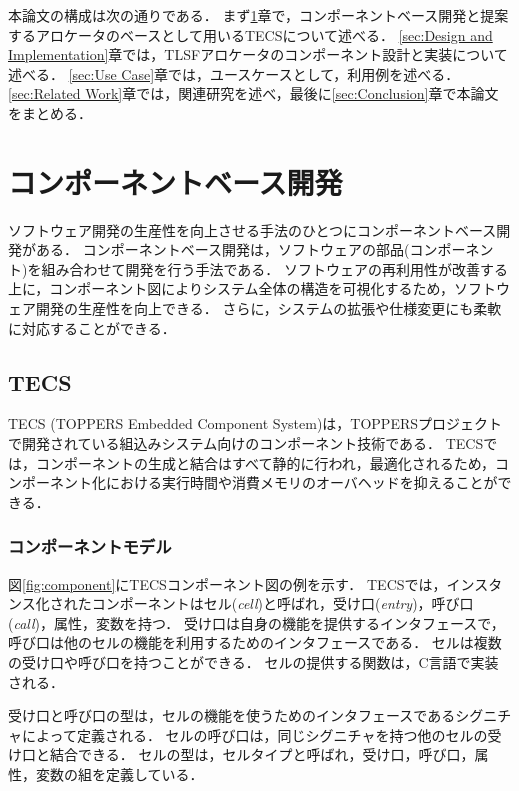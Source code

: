 \documentclass[submit]{ipsj_v2/UTF8/ipsj}
\begin{document}
本論文の構成は次の通りである．
まず\ref{sec:ComponentBasedDevelopment}章で，コンポーネントベース開発と提案するアロケータのベースとして用いるTECSについて述べる．
\ref{sec:Design and Implementation}章では，TLSFアロケータのコンポーネント設計と実装について述べる．
\ref{sec:Use Case}章では，ユースケースとして，利用例を述べる．
\ref{sec:Related Work}章では，関連研究を述べ，最後に\ref{sec:Conclusion}章で本論文をまとめる．

\section{コンポーネントベース開発}
\label{sec:ComponentBasedDevelopment}

ソフトウェア開発の生産性を向上させる手法のひとつにコンポーネントベース開発がある．
コンポーネントベース開発は，ソフトウェアの部品(コンポーネント)を組み合わせて開発を行う手法である．
ソフトウェアの再利用性が改善する上に，コンポーネント図によりシステム全体の構造を可視化するため，ソフトウェア開発の生産性を向上できる．
さらに，システムの拡張や仕様変更にも柔軟に対応することができる．

\subsection{TECS}
TECS (TOPPERS Embedded Component System)は，TOPPERSプロジェクトで開発されている組込みシステム向けのコンポーネント技術である．
TECSでは，コンポーネントの生成と結合はすべて静的に行われ，最適化されるため，コンポーネント化における実行時間や消費メモリのオーバヘッドを抑えることができる．

\subsubsection{コンポーネントモデル}
図\ref{fig:component}にTECSコンポーネント図の例を示す．
TECSでは，インスタンス化されたコンポーネントはセル({\it cell})と呼ばれ，受け口({\it entry})，呼び口({\it call})，属性，変数を持つ．
受け口は自身の機能を提供するインタフェースで，呼び口は他のセルの機能を利用するためのインタフェースである．
セルは複数の受け口や呼び口を持つことができる．
セルの提供する関数は，C言語で実装される．

受け口と呼び口の型は，セルの機能を使うためのインタフェースであるシグニチャによって定義される．
セルの呼び口は，同じシグニチャを持つ他のセルの受け口と結合できる．
セルの型は，セルタイプと呼ばれ，受け口，呼び口，属性，変数の組を定義している．
\end{document}
